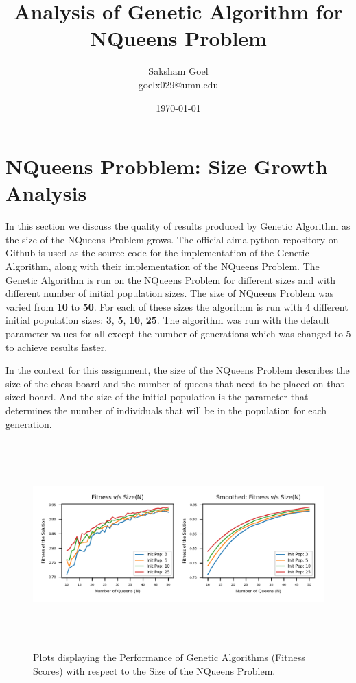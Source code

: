 \documentclass[11pt]{article}
\title{Analysis of Genetic Algorithm for NQueens Problem}
\author{
Saksham Goel\\goelx029@umn.edu
}
\date{\today}
\begin{document}
\maketitle

\section{NQueens Probblem: Size Growth Analysis}
\label{sec:fig}

In this section we discuss the quality of results produced by Genetic Algorithm as the size of the NQueens Problem grows. The official aima-python repository on Github is used as the source code for the implementation of the Genetic Algorithm, along with their implementation of the NQueens Problem. The Genetic Algorithm is run on the NQueens Problem for different sizes and with different number of initial population sizes. The size of NQueens Problem was varied from \textbf{10} to \textbf{50}. For each of these sizes the algorithm is run with 4 different initial population sizes: \textbf{3}, \textbf{5}, \textbf{10}, \textbf{25}.  The algorithm was run with the default parameter values for all except the number of generations which was changed to 5 to achieve results faster.

In the context for this assignment, the size of the NQueens Problem describes the size of the chess board and the number of queens that need to be placed on that sized board. And the size of the initial population is the parameter that determines the number of individuals that will be in the population for each generation.


   \begin{figure}[h] %
      \centering
      \includegraphics[width=\textwidth,height=80mm,keepaspectratio]{../plots/Q1.png}
      \caption{Plots displaying the Performance of Genetic Algorithms (Fitness Scores) with respect to the Size of the NQueens Problem.}
      \label{fig:tabl}
   \end{figure}
\end{document}
